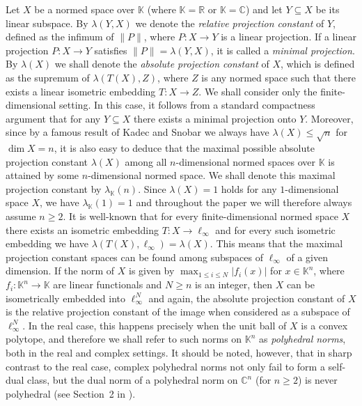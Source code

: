 \documentclass[12pt, reqno]{amsart}
\theoremstyle{definition}
\theoremstyle{remark}
\numberwithin{equation}{section}
\begin{document}
Let $X$ be a normed space over $\mathbb{K}$ (where $\mathbb{K}=\mathbb{R}$ or $\mathbb{K}=\mathbb{C}$) and let $Y \subseteq X$ be its linear subspace. By $\lambda(Y, X)$ we denote the \emph{relative projection constant} of $Y$, defined as the infimum of $\|P\|$, where $P: X \to Y$ is a linear projection. If a linear projection $P: X \to Y$ satisfies $\|P\|=\lambda(Y, X)$, it is called a \emph{minimal projection}. By $\lambda(X)$ we shall denote the \emph{absolute projection constant} of $X$, which is defined as the supremum of $\lambda(T(X), Z)$, where $Z$ is any normed space such that there exists a linear isometric embedding $T: X \to Z$. We shall consider only the finite-dimensional setting. In this case, it follows from a standard compactness argument that for any $Y \subseteq X$ there exists a minimal projection onto $Y$. Moreover, since by a famous result of Kadec and Snobar \cite{kadecsnobar} we always have $\lambda(X) \leq \sqrt{n}$ for $\dim X = n$, it is also easy to deduce that the maximal possible absolute projection constant $\lambda(X)$ among all $n$-dimensional normed spaces over $\mathbb{K}$ is attained by some $n$-dimensional normed space. We shall denote this maximal projection constant by $\lambda_{\mathbb{K}}(n)$. Since $\lambda(X)=1$ holds for any $1$-dimensional space $X$, we have $\lambda_{\mathbb{K}}(1)=1$ and throughout the paper we will therefore always assume $n \geq 2$. It is well-known that for every finite-dimensional normed space $X$ there exists an isometric embedding $T: X \to \ell_{\infty}$ and for every such isometric embedding we have $\lambda(T(X), \ell_{\infty})=\lambda(X)$. This means that the maximal projection constant spaces can be found among subspaces of $\ell_{\infty}$ of a given dimension. If the norm of $X$ is given by $\max_{ 1 \leq i \leq N} |f_i(x)|$ for $x \in \mathbb{K}^n$, where $f_i: \mathbb{K}^n \to \mathbb{K}$ are linear functionals and $N \geq n$ is an integer, then $X$ can be isometrically embedded into $\ell_{\infty}^N$ and again, the absolute projection constant of $X$ is the relative projection constant of the image when considered as a subspace of $\ell_{\infty}^N$. In the real case, this happens precisely when the unit ball of $X$ is a convex polytope, and therefore we shall refer to such norms on $\mathbb{K}^n$ as \emph{polyhedral norms}, both in the real and complex settings. It should be noted, however, that in sharp contrast to the real case, complex polyhedral norms not only fail to form a self-dual class, but the dual norm of a polyhedral norm on $\mathbb{C}^n$ (for $n \geq 2$) is never polyhedral (see Section~2 in \cite{koboslewicki}).
\end{document}

